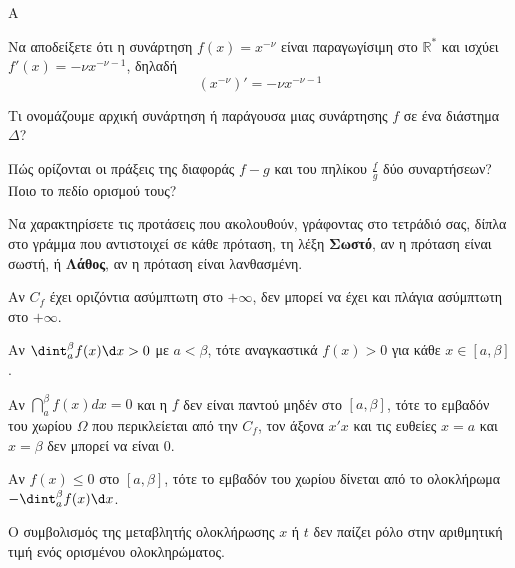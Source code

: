 \begin{thema}{A}
\begin{erwthma}
    \item Να αποδείξετε ότι η συνάρτηση $ f(x)=x^{-\nu} $ είναι παραγωγίσιμη στο $ \mathbb{R}^* $ και ισχύει $ f'(x)=-\nu x^{-\nu-1} $, δηλαδή \[ \left(x^{-\nu} \right)'=-\nu x^{-\nu-1} \]
    \item Τι ονομάζουμε αρχική συνάρτηση ή παράγουσα μιας συνάρτησης $f$ σε ένα διάστημα $\Delta$?
    \item Πώς ορίζονται οι πράξεις της διαφοράς $f-g$ και του πηλίκου $\frac{f}{g}$ δύο συναρτήσεων? Ποιο το πεδίο ορισμού τους?
    \item Να χαρακτηρίσετε τις προτάσεις που ακολουθούν, γράφοντας στο τετράδιό σας, δίπλα στο γράμμα που αντιστοιχεί σε κάθε πρόταση, τη λέξη \textbf{Σωστό}, αν η πρόταση είναι σωστή, ή \textbf{Λάθος}, αν η πρόταση είναι λανθασμένη.
    \begin{alist}
        \item Αν $C_f$ έχει οριζόντια ασύμπτωτη στο $+\infty$, δεν μπορεί να έχει και πλάγια ασύμπτωτη στο $+\infty$.
        \item Αν $\dint_a^\beta f(x)\d x > 0$ με $a < \beta$, τότε αναγκαστικά $f(x) > 0$ για κάθε $x \in [a, \beta]$.
        \item Αν $\dint_a^\beta f(x)dx = 0$ και η $f$ δεν είναι παντού μηδέν στο $[a,\beta]$, τότε το εμβαδόν του χωρίου $\Omega$ που περικλείεται από την $C_f$, τον άξονα $x'x$ και τις ευθείες $x=a$ και $x=\beta$ δεν μπορεί να είναι $0$.
        \item Αν $f(x) \le 0$ στο $[a, \beta]$, τότε το εμβαδόν του χωρίου δίνεται από το ολοκλήρωμα $-\dint_a^\beta f(x) \d x$.
        \item Ο συμβολισμός της μεταβλητής ολοκλήρωσης $x$ ή $t$ δεν παίζει ρόλο στην αριθμητική τιμή ενός ορισμένου ολοκληρώματος.
    \end{alist}

\end{erwthma}
\end{thema}


